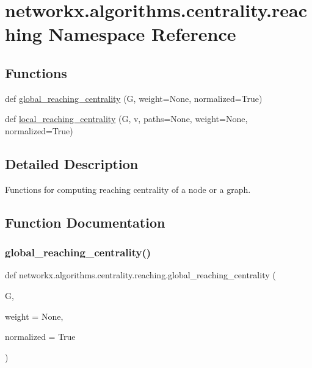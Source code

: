 \hypertarget{namespacenetworkx_1_1algorithms_1_1centrality_1_1reaching}{}\section{networkx.\+algorithms.\+centrality.\+reaching Namespace Reference}
\label{namespacenetworkx_1_1algorithms_1_1centrality_1_1reaching}
\subsection*{Functions}
\begin{DoxyCompactItemize}
\item 
def \hyperlink{namespacenetworkx_1_1algorithms_1_1centrality_1_1reaching_a36f81311bed9678b120fc7dcac384bf5}{global\+\_\+reaching\+\_\+centrality} (G, weight=None, normalized=True)
\item 
def \hyperlink{namespacenetworkx_1_1algorithms_1_1centrality_1_1reaching_a20413b1f788576335f9598ea582aaec3}{local\+\_\+reaching\+\_\+centrality} (G, v, paths=None, weight=None, normalized=True)
\end{DoxyCompactItemize}


\subsection{Detailed Description}
\begin{DoxyVerb}Functions for computing reaching centrality of a node or a graph.\end{DoxyVerb}
 

\subsection{Function Documentation}
\mbox{\label{namespacenetworkx_1_1algorithms_1_1centrality_1_1reaching_a36f81311bed9678b120fc7dcac384bf5}} 
\subsubsection{\texorpdfstring{global\+\_\+reaching\+\_\+centrality()}{global\_reaching\_centrality()}}
{\footnotesize\ttfamily def networkx.\+algorithms.\+centrality.\+reaching.\+global\+\_\+reaching\+\_\+centrality (\begin{DoxyParamCaption}\item[{}]{G,  }\item[{}]{weight = {\ttfamily None},  }\item[{}]{normalized = {\ttfamily True} }\end{DoxyParamCaption})}

